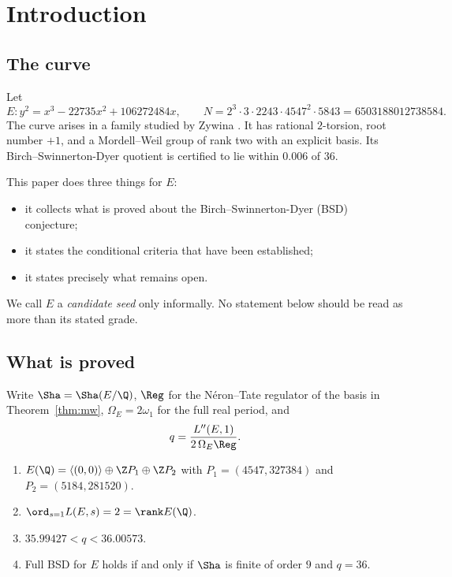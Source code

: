 \section{Introduction}\label{sec:intro}

\subsection{The curve}
Let
\[
E\colon y^2=x^3-22735x^2+106272484x,\qquad N=2^3\cdot3\cdot2243\cdot4547^2\cdot5843=6503188012738584 .
\]
The curve arises in a family studied by Zywina \cite{zywina}. It has rational $2$-torsion, root number $+1$, and a Mordell--Weil group of rank two with an explicit basis. Its Birch--Swinnerton-Dyer quotient is certified to lie within $0.006$ of $36$.

This paper does three things for $E$:
\begin{itemize}[leftmargin=*]
\item it collects what is proved about the Birch--Swinnerton-Dyer (BSD) conjecture;
\item it states the conditional criteria that have been established;
\item it states precisely what remains open.
\end{itemize}
We call $E$ a \emph{candidate seed} only informally. No statement below should be read as more than its stated grade.

\subsection{What is proved}
Write $\Sha=\Sha(E/\Q)$, $\Reg$ for the N\'eron--Tate regulator of the basis in Theorem~\ref{thm:mw}, $\Omega_E=2\omega_1$ for the full real period, and
\[
q=\frac{L''(E,1)}{2\,\Omega_E\Reg}.
\]

\begin{theorem}\label{thm:A}
\begin{enumerate}[label=(\roman*)]
\item $E(\Q)=\langle(0,0)\rangle\oplus\Z P_1\oplus\Z P_2$ with $P_1=(4547,327384)$ and $P_2=(5184,281520)$.
\item $\ord_{s=1}L(E,s)=2=\rank E(\Q)$.
\item $35.99427<q<36.00573$.
\item Full BSD for $E$ holds if and only if $\Sha$ is finite of order $9$ and $q=36$.
\end{enumerate}
\end{theorem}


